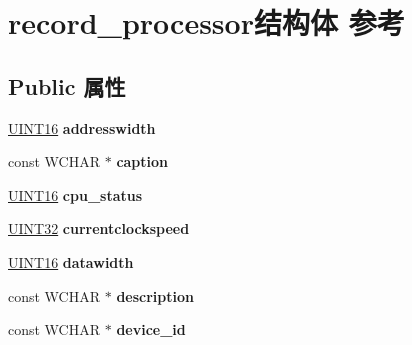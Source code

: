 \hypertarget{structrecord__processor}{}\section{record\+\_\+processor结构体 参考}
\label{structrecord__processor}
\subsection*{Public 属性}
\begin{DoxyCompactItemize}
\item 
\mbox{\label{structrecord__processor_a305ca9c49dc3b6092fbd40807f6deb0d}} 
\hyperlink{_processor_bind_8h_a09f1a1fb2293e33483cc8d44aefb1eb1}{U\+I\+N\+T16} {\bfseries addresswidth}
\item 
\mbox{\label{structrecord__processor_ac9a00d9dfc81f0eac9e211fd16ada00f}} 
const W\+C\+H\+AR $\ast$ {\bfseries caption}
\item 
\mbox{\label{structrecord__processor_a3bf401a66ba5ab2cbd722d041599baea}} 
\hyperlink{_processor_bind_8h_a09f1a1fb2293e33483cc8d44aefb1eb1}{U\+I\+N\+T16} {\bfseries cpu\+\_\+status}
\item 
\mbox{\label{structrecord__processor_aadbb222ddf142938e13557e01c6bc659}} 
\hyperlink{_processor_bind_8h_ae1e6edbbc26d6fbc71a90190d0266018}{U\+I\+N\+T32} {\bfseries currentclockspeed}
\item 
\mbox{\label{structrecord__processor_a01014fc0bee8d76045202d59f1d4de9a}} 
\hyperlink{_processor_bind_8h_a09f1a1fb2293e33483cc8d44aefb1eb1}{U\+I\+N\+T16} {\bfseries datawidth}
\item 
\mbox{\label{structrecord__processor_a8c284d741b3c3c092340a01ae259b637}} 
const W\+C\+H\+AR $\ast$ {\bfseries description}
\item 
\mbox{\label{structrecord__processor_a145ce75134c062e47e0120117821fe85}} 
const W\+C\+H\+AR $\ast$ {\bfseries device\+\_\+id}
\item 
\mbox{\label{structrecord__processor_afb7435a8173242ecc958b6ccf713e341}} 

\end{DoxyCompactItemize}
